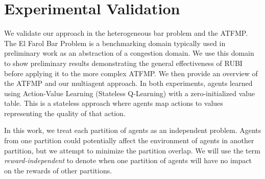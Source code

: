 \documentclass[letterpaper]{article}
\begin{document}


\section{Experimental Validation}

We validate our approach in the heterogeneous bar problem and the ATFMP. The El Farol Bar Problem \cite{BarProblem} is a benchmarking domain typically used in preliminary work as an abstraction of a congestion domain. We use this domain to show preliminary results demonstrating the general effectiveness of RUBI before applying it to the more complex ATFMP. We then provide an overview of the ATFMP and our multiagent approach. In both experiments, agents learned using Action-Value Learning (Stateless Q-Learning) with a zero-initialized value table. This is a stateless approach where agents map actions to values representing the quality of that action. 


In this work, we treat each partition of agents as an independent problem. Agents from one partition could potentially affect the environment of agents in another partition, but we attempt to minimize the partition overlap. We will use the term \textit{reward-independent} to denote when one partition of agents will have no impact on the rewards of other partitions. 
\end{document}
